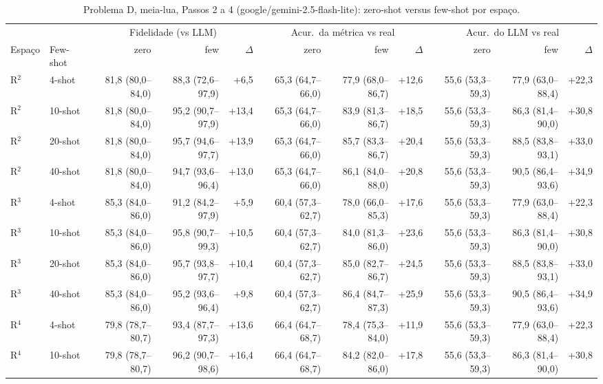 \begin{table}[htbp]
\centering
\footnotesize
\caption{Problema D, meia-lua, Passos 2 a 4 (google/gemini-2.5-flash-lite): zero-shot versus few-shot por espaço.}
\label{tab:bloco1_D_passo2_vs_passo3_flashlite}
\begin{tabular}{llrrrrrrrrr}
\toprule
 &  & \multicolumn{3}{c}{Fidelidade (vs LLM)} & \multicolumn{3}{c}{Acur.\ da métrica vs real} & \multicolumn{3}{c}{Acur.\ do LLM vs real} \\ \cmidrule(lr){3-5} \cmidrule(lr){6-8} \cmidrule(lr){9-11}
Espaço & Few-shot & zero & few & $\Delta$ & zero & few & $\Delta$ & zero & few & $\Delta$ \\
\midrule
R$^2$ & 4-shot & 81,8 (80,0–84,0) & 88,3 (72,6–97,9) & +6,5 & 65,3 (64,7–66,0) & 77,9 (68,0–86,7) & +12,6 & 55,6 (53,3–59,3) & 77,9 (63,0–88,4) & +22,3 \\
R$^2$ & 10-shot & 81,8 (80,0–84,0) & 95,2 (90,7–97,9) & +13,4 & 65,3 (64,7–66,0) & 83,9 (81,3–86,7) & +18,5 & 55,6 (53,3–59,3) & 86,3 (81,4–90,0) & +30,8 \\
R$^2$ & 20-shot & 81,8 (80,0–84,0) & 95,7 (94,6–97,7) & +13,9 & 65,3 (64,7–66,0) & 85,7 (83,3–86,7) & +20,4 & 55,6 (53,3–59,3) & 88,5 (83,8–93,1) & +33,0 \\
R$^2$ & 40-shot & 81,8 (80,0–84,0) & 94,7 (93,6–96,4) & +13,0 & 65,3 (64,7–66,0) & 86,1 (84,0–88,0) & +20,8 & 55,6 (53,3–59,3) & 90,5 (86,4–93,6) & +34,9 \\
\midrule
R$^3$ & 4-shot & 85,3 (84,0–86,0) & 91,2 (84,2–97,9) & +5,9 & 60,4 (57,3–62,7) & 78,0 (66,0–85,3) & +17,6 & 55,6 (53,3–59,3) & 77,9 (63,0–88,4) & +22,3 \\
R$^3$ & 10-shot & 85,3 (84,0–86,0) & 95,8 (90,7–99,3) & +10,5 & 60,4 (57,3–62,7) & 84,0 (81,3–86,0) & +23,6 & 55,6 (53,3–59,3) & 86,3 (81,4–90,0) & +30,8 \\
R$^3$ & 20-shot & 85,3 (84,0–86,0) & 95,7 (93,8–97,7) & +10,4 & 60,4 (57,3–62,7) & 85,0 (82,7–86,7) & +24,5 & 55,6 (53,3–59,3) & 88,5 (83,8–93,1) & +33,0 \\
R$^3$ & 40-shot & 85,3 (84,0–86,0) & 95,2 (93,6–96,4) & +9,8 & 60,4 (57,3–62,7) & 86,4 (84,7–87,3) & +25,9 & 55,6 (53,3–59,3) & 90,5 (86,4–93,6) & +34,9 \\
\midrule
R$^4$ & 4-shot & 79,8 (78,7–80,7) & 93,4 (87,7–97,3) & +13,6 & 66,4 (64,7–68,7) & 78,4 (75,3–84,0) & +11,9 & 55,6 (53,3–59,3) & 77,9 (63,0–88,4) & +22,3 \\
R$^4$ & 10-shot & 79,8 (78,7–80,7) & 96,2 (90,7–98,6) & +16,4 & 66,4 (64,7–68,7) & 84,2 (82,0–86,0) & +17,8 & 55,6 (53,3–59,3) & 86,3 (81,4–90,0) & +30,8 \\

\end{tabular}
\end{table}
